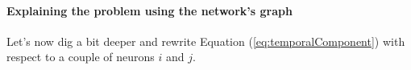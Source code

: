 %

\paragraph{Explaining the problem using the network's graph}
Let's now dig a bit deeper and rewrite Equation (\ref{eq:temporalComponent}) with respect to a couple of neurons $i$ and $j$.

